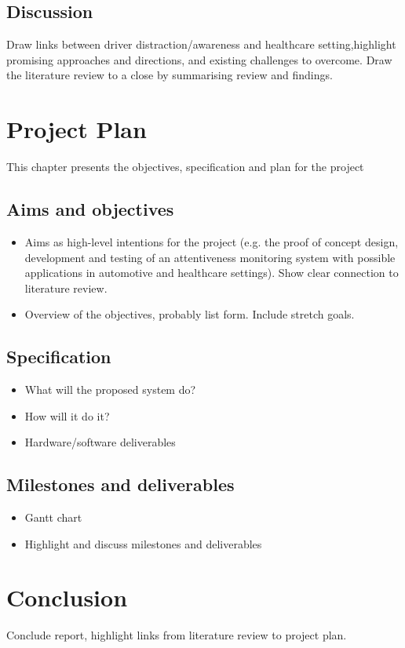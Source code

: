 \documentclass[11pt, parskip=half*,twoside=false]{scrbook}
\begin{document}
\section{Discussion}
Draw links between driver distraction/awareness and healthcare setting,highlight promising approaches and directions, and existing challenges to overcome. Draw the literature review to a close by summarising review and findings. 


\chapter{Project Plan}
This chapter presents the objectives, specification and plan for the project

\section{Aims and objectives}
\begin{itemize}
	\item Aims as high-level intentions for the project (e.g. the proof of concept design, development and testing of an attentiveness monitoring system with possible applications in automotive and healthcare settings). Show clear connection to literature review. 
	\item Overview of the objectives, probably list form. Include stretch goals.
\end{itemize}

\section{Specification}
\begin{itemize}
	\item What will the proposed system do?
	\item How will it do it?
	\item Hardware/software deliverables
\end{itemize}

\section{Milestones and deliverables}
\begin{itemize}
	\item Gantt chart
	\item Highlight and discuss milestones and deliverables
\end{itemize}

\chapter{Conclusion}
Conclude report, highlight links from literature review to project plan.


\end{document}
